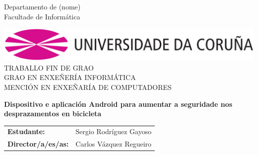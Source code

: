 \begin{titlepage}

  \hspace*{128pt}
  \textcolor{udcgray}{{\selectfont Departamento de (nome)}}\\[-2pt]
  \hspace*{145pt}
  \textcolor{udcpink}{{\selectfont Facultade de Informática}}\\[-32pt]

  \begin{center}
    \includegraphics[scale=0.3]{imaxes/udc}\\[35pt]

    {\large TRABALLO FIN DE GRAO \\
            GRAO EN ENXEÑERÍA INFORMÁTICA \\
            MENCIÓN EN ENXEÑARÍA DE COMPUTADORES } \\[100pt]

    \begin{huge}
      \bfseries Dispositivo e aplicación Android para aumentar a seguridade nos
desprazamentos en bicicleta \\[7pt]

    \end{huge}
  \end{center}

  \vfill

  \begin{flushright}
    {\large
    \begin{tabular}{ll}
      {\bf Estudante:}        & Sergio Rodríguez Gayoso \\
      {\bf Director/a/es/as:} & Carlos Vázquez Regueiro \\

    \end{tabular}}
  \end{flushright}
\end{titlepage}
